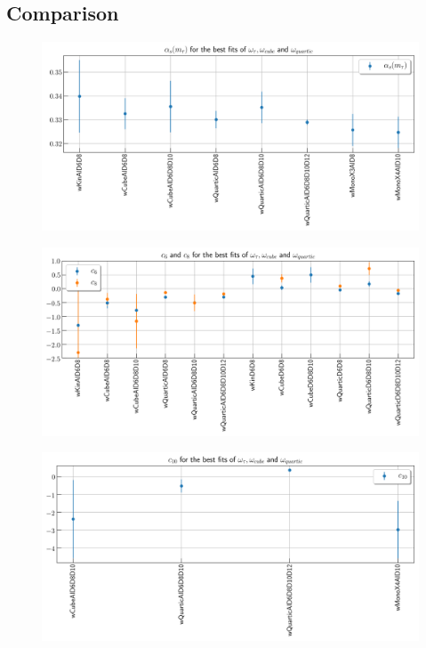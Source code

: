 \documentclass[../../index.tex]{subfiles}
\begin{document}
\subsection{Comparison}
\begin{figure}[H]
  \includegraphics[width=\textwidth]{./images/comparisonAlpha.png}
\end{figure}
\begin{figure}[H]
  \includegraphics[width=\textwidth]{./images/comparisonD6D8.png}
\end{figure}
\begin{figure}[H]
  \includegraphics[width=\textwidth]{./images/comparisonD10.png}
\end{figure}
\end{document}
